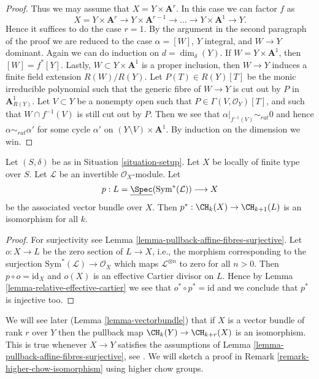\begin{proof}
\medskip\noindent
Thus we may assume that $X = Y \times \mathbf{A}^r$.
In this case we can factor $f$ as
$$
X = Y \times \mathbf{A}^r \to
Y \times \mathbf{A}^{r - 1} \to \ldots \to
Y \times \mathbf{A}^1 \to Y.
$$
Hence it suffices to do the case $r = 1$. By the argument in the
second paragraph of the proof we are reduced to the case
$\alpha = [W]$, $Y$ integral, and $W \to Y$ dominant.
Again we can do induction on $d = \dim_\delta(Y)$.
If $W = Y \times \mathbf{A}^1$, then $[W] = f^*[Y]$.
Lastly, $W \subset Y \times \mathbf{A}^1$ is a proper inclusion,
then $W \to Y$ induces a finite field extension $R(W)/R(Y)$.
Let $P(T) \in R(Y)[T]$ be the monic irreducible polynomial such
that the generic fibre of $W \to Y$ is cut out by $P$ in
$\mathbf{A}^1_{R(Y)}$. Let $V \subset Y$ be a nonempty open such
that $P \in \Gamma(V, \mathcal{O}_Y)[T]$, and such that
$W \cap f^{-1}(V)$ is still cut out by $P$. Then we see that
$\alpha|_{f^{-1}(V)} \sim_{rat} 0$ and hence $\alpha \sim_{rat} \alpha'$
for some cycle $\alpha'$ on $(Y \setminus V) \times \mathbf{A}^1$.
By induction on the dimension we win.
\end{proof}

\begin{lemma}
\label{lemma-linebundle}
Let $(S, \delta)$ be as in Situation \ref{situation-setup}.
Let $X$ be locally of finite type over $S$.
Let $\mathcal{L}$ be an invertible $\mathcal{O}_X$-module.
Let
$$
p :
L = \underline{\Spec}(\text{Sym}^*(\mathcal{L}))
\longrightarrow
X
$$
be the associated vector bundle over $X$.
Then $p^* : \CH_k(X) \to \CH_{k + 1}(L)$ is an isomorphism for all $k$.
\end{lemma}

\begin{proof}
For surjectivity see Lemma \ref{lemma-pullback-affine-fibres-surjective}.
Let $o : X \to L$ be the zero section of $L \to X$, i.e., the morphism
corresponding to the surjection $\text{Sym}^*(\mathcal{L}) \to \mathcal{O}_X$
which maps $\mathcal{L}^{\otimes n}$ to zero for all $n > 0$.
Then $p \circ o = \text{id}_X$ and $o(X)$ is an effective
Cartier divisor on $L$. Hence by Lemma \ref{lemma-relative-effective-cartier}
we see that $o^* \circ p^* = \text{id}$ and we conclude that $p^*$ is
injective too.
\end{proof}

\begin{remark}
\label{remark-when-isomorphism}
We will see later (Lemma \ref{lemma-vectorbundle}) that if $X$ is a
vector bundle of rank $r$ over $Y$ then the pullback map
$\CH_k(Y) \to \CH_{k + r}(X)$
is an isomorphism. This is true whenever $X \to Y$ satisfies
the assumptions of Lemma \ref{lemma-pullback-affine-fibres-surjective}, see
\cite[Lemma 2.2]{Totaro-group}. We will sketch a proof in
Remark \ref{remark-higher-chow-isomorphism} using higher chow groups.
\end{remark}

